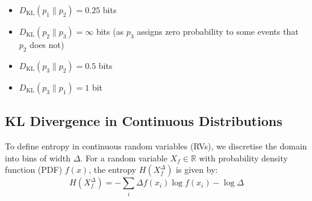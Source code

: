 {\begin{center}
\begin{tikzpicture}
        \end{tikzpicture}

    \end{center}

    \begin{itemize}
        \item \( D_{\text{KL}}(p_1 \parallel p_2) = 0.25 \) bits
        \item \( D_{\text{KL}}(p_2 \parallel p_3) = \infty \) bits (as \( p_3 \) assigns zero probability to some events that \( p_2 \) does not)
        \item \( D_{\text{KL}}(p_3 \parallel p_2) = 0.5 \) bits
        \item \( D_{\text{KL}}(p_3 \parallel p_1) = 1 \) bit
    \end{itemize}
}







\subsection{KL Divergence in Continuous Distributions}

To define entropy in continuous random variables (RVs), we discretise the domain into bins of width \(\Delta\). For a random variable \(X_f \in \mathbb{R}\) with probability density function (PDF) \(f(x)\), the entropy \(H(X^\Delta_f)\) is given by:
\[
    H(X^\Delta_f) = - \sum_i \Delta f(x_i) \log f(x_i) - \log \Delta
\]


